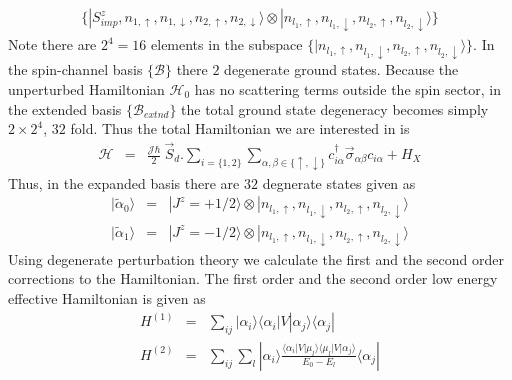 \documentclass[reprint,prb,superscriptaddress]{revtex4-2}
\begin{document}
\begin{eqnarray}
\{|S^z_{imp},n_{1,\uparrow},n_{1,\downarrow},n_{2,\uparrow},n_{2,\downarrow}\rangle \otimes |n_{l_1,\uparrow},n_{l_1,\downarrow},n_{l_2,\uparrow},n_{l_2,\downarrow}\rangle\} \nonumber
\end{eqnarray}
Note there are $2^4=16$ elements in the subspace $\{|n_{l_1,\uparrow},n_{l_1,\downarrow},n_{l_2,\uparrow},n_{l_2,\downarrow}\rangle\}$. In the spin-channel basis $\{\mathcal{B}\}$ there $2$ degenerate ground states. Because the unperturbed Hamiltonian $\mathcal{H}_0$ has no scattering terms outside the spin sector, in the extended basis $\{\mathcal{B}_{extnd}\}$ the total ground state degeneracy becomes simply $2\times 2^4$, $32$ fold. Thus the total Hamiltonian we are interested in is 
\begin{eqnarray}
\mathcal{H} &=& \frac{{\mathcal{J}}\hbar}{2}~ \vec{S}_d. \displaystyle\sum_{i=\{1,2\}} \displaystyle\sum_{\alpha,\beta\in\{\uparrow,\downarrow\}}c_{i\alpha}^{\dagger} \vec{\sigma}_{\alpha\beta} c_{i\alpha} +H_X
\label{eq:excitation_hamiltonian}
\end{eqnarray}
Thus, in the expanded basis there are $32$ degnerate states given as 
\begin{eqnarray}
|\tilde{\alpha}_0\rangle &=&|J^z=+1/2\rangle\otimes |n_{l_1,\uparrow},n_{l_1,\downarrow},n_{l_2,\uparrow},n_{l_2,\downarrow}\rangle \\
|\tilde{\alpha}_1\rangle &=& |J^z=-1/2 \rangle\otimes |n_{l_1,\uparrow},n_{l_1,\downarrow},n_{l_2,\uparrow},n_{l_2,\downarrow}\rangle
\end{eqnarray}
Using degenerate perturbation theory we calculate the first and the second order corrections to the Hamiltonian. The first order and the second order low energy effective Hamiltonian is given as 
\begin{eqnarray}
H^{(1)} &=& \sum_{ij} |\alpha_i\rangle \langle \alpha_i  | V| \alpha_j \rangle \langle \alpha_j |~\nonumber\\
H^{(2)} &=& \sum_{ij} \sum_l |\alpha_i\rangle \frac{\langle \alpha_i  | V| \mu_l \rangle \langle \mu_l  | V| \alpha_j \rangle}{E_0-E_{l}}\langle \alpha_j |
\end{eqnarray}
\end{document}
